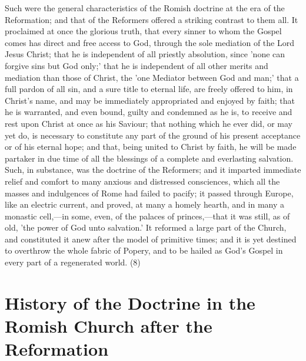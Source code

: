 \documentclass[
]{book}
\begin{document}
Such were the general characteristics of the Romish doctrine at the era of the Reformation; and that of the Reformers offered a striking contrast to them all. It proclaimed at once the glorious truth, that every sinner to whom the Gospel comes has direct and free access to God, through the sole mediation of the Lord Jesus Christ; that he is independent of all priestly absolution, since 'none can forgive sins but God only;' that he is independent of all other merits and mediation than those of Christ, the 'one Mediator between God and man;' that a full pardon of all sin, and a sure title to eternal life, are freely offered to him, in Christ's name, and may be immediately appropriated and enjoyed by faith; that he is warranted, and even bound, guilty and condemned as he is, to receive and rest upon Christ at once as his Saviour; that nothing which he ever did, or may yet do, is necessary to constitute any part of the ground of his present acceptance or of his eternal hope; and that, being united to Christ by faith, he will be made partaker in due time of all the blessings of a complete and everlasting salvation. Such, in substance, was the doctrine of the Reformers; and it imparted immediate relief and comfort to many anxious and distressed consciences, which all the masses and indulgences of Rome had failed to pacify; it passed through Europe, like an electric current, and proved, at many a homely hearth, and in many a monastic cell,---in some, even, of the palaces of princes,---that it was still, as of old, 'the power of God unto salvation.' It reformed a large part of the Church, and constituted it anew after the model of primitive times; and it is yet destined to overthrow the whole fabric of Popery, and to be hailed as God's Gospel in every part of a regenerated world. (8)

\hypertarget{history-of-the-doctrine-in-the-romish-church-after-the-reformation}{%
\chapter{History of the Doctrine in the Romish Church after the Reformation}\label{history-of-the-doctrine-in-the-romish-church-after-the-reformation}}
\end{document}
